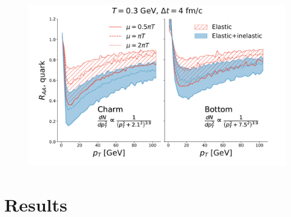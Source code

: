 \documentclass[aps, prc, reprint, amsmath, groupedaddress, nofootinbib]{revtex4-1}
\begin{document}
\begin{figure}
\includegraphics[width=\textwidth]{compare-plot/Box_Raa.pdf}
\end{figure}

\section{Results}
\end{document}
